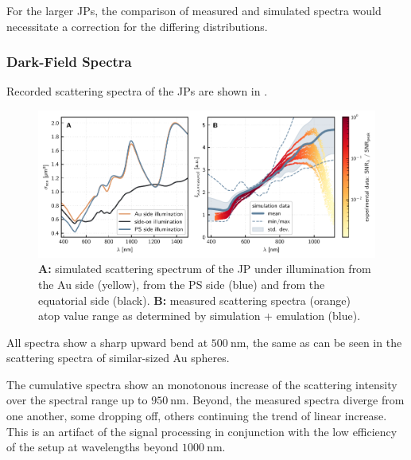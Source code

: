 \documentclass[10pt]{article}
\newcommand{\reffig}[2]{\mbox{\sffamily{Figure \ref{#1}#2}}}
\begin{document}
For the larger JPs, the comparison of measured and simulated spectra would necessitate a correction for the differing distributions. 

\subsubsection*{Dark-Field Spectra}


Recorded scattering spectra of the JPs are shown in \reffig{fig:spectra}{B}.

\begin{figure}[t]
    \centering
    \includegraphics{[fig] spectra.PDF}
    \caption{{\sffamily\bfseries A:} simulated scattering spectrum of the JP under illumination from the Au side (yellow), from the PS side (blue) and from the equatorial side (black). {\sffamily\bfseries B:} measured scattering spectra (orange) atop value range as determined by simulation + emulation (blue).}
    \label{fig:spectra}
\end{figure}


All spectra show a sharp upward bend at $\SI{500}{\nano\meter}$, the same as can be seen in the scattering spectra of similar-sized Au spheres. 

The cumulative spectra show an monotonous increase of the scattering intensity over the spectral range up to $\SI{950}{\nano\meter}$. 
Beyond, the measured spectra diverge from one another, some dropping off, others continuing the trend of linear increase.  
This is an artifact of the signal processing in conjunction with the low efficiency of the setup at wavelengths beyond $\SI{1000}{\nano\meter}$. 

\end{document}
